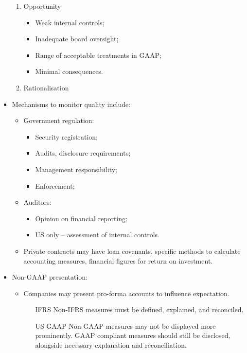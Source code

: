 \documentclass[../notes_compiled.tex]{subfiles}
\begin{document}
\begin{itemize}
\begin{enumerate}
\item Opportunity
\begin{itemize}
\item Weak internal controls;
\item Inadequate board oversight;
\item Range of acceptable treatments in GAAP;
\item Minimal consequences.
\end{itemize}


\item Rationalisation

\end{enumerate}

\item Mechanisms to monitor quality include:
\begin{itemize}
\item Government regulation:
\begin{itemize}
\item Security registration;
\item Audits, disclosure requirements;
\item Management responsibility;
\item Enforcement;
\end{itemize}
\item Auditors:
\begin{itemize}
\item Opinion on financial reporting;
\item US only -- assessment of internal controls.
\end{itemize}
\item Private contracts may have loan covenants, specific methods to calculate accounting measures, financial figures for return on investment.
\end{itemize}

\item Non-GAAP presentation:
\begin{itemize}
\item Companies may present pro-forma accounts to influence expectation.
\begin{itemize}
\item[IFRS] Non-IFRS measures must be defined, explained, and reconciled.
\item[US GAAP] Non-GAAP measures may not be displayed more prominently. GAAP compliant measures should still be disclosed, alongside necessary explanation and reconciliation.
\end{itemize}
\end{itemize}
\end{itemize}
\end{document}
